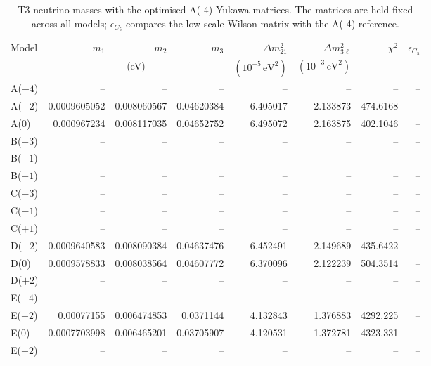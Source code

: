\begin{table}[p]
\centering
\caption{T3 neutrino masses with the optimised A(-4) Yukawa matrices. The matrices are held fixed across all models; $\epsilon_{C_5}$ compares the low-scale Wilson matrix with the A(-4) reference.}
\label{tab:appC_Am4_masses}
\begingroup
\footnotesize
\setlength{\tabcolsep}{3.2pt}
\begin{tabular}{lrrrrrrr}
\hline
Model & $m_1$ & $m_2$ & $m_3$ & $\Delta m^2_{21}$ & $\Delta m^2_{3\ell}$ & $\chi^2$ & $\epsilon_{C_5}$ \\
 & \multicolumn{3}{c}{(eV)} & $(10^{-5}\,\mathrm{eV}^2)$ & $(10^{-3}\,\mathrm{eV}^2)$ &  &  \\
\hline
A($-4$) & -- & -- & -- & -- & -- & -- & -- \\
A($-2$) & 0.0009605052 & 0.008060567 & 0.04620384 & 6.405017 & 2.133873 & 474.6168 & -- \\
A($0$) & 0.000967234 & 0.008117035 & 0.04652752 & 6.495072 & 2.163875 & 402.1046 & -- \\
B($-3$) & -- & -- & -- & -- & -- & -- & -- \\
B($-1$) & -- & -- & -- & -- & -- & -- & -- \\
B($+1$) & -- & -- & -- & -- & -- & -- & -- \\
C($-3$) & -- & -- & -- & -- & -- & -- & -- \\
C($-1$) & -- & -- & -- & -- & -- & -- & -- \\
C($+1$) & -- & -- & -- & -- & -- & -- & -- \\
D($-2$) & 0.0009640583 & 0.008090384 & 0.04637476 & 6.452491 & 2.149689 & 435.6422 & -- \\
D($0$) & 0.0009578833 & 0.008038564 & 0.04607772 & 6.370096 & 2.122239 & 504.3514 & -- \\
D($+2$) & -- & -- & -- & -- & -- & -- & -- \\
E($-4$) & -- & -- & -- & -- & -- & -- & -- \\
E($-2$) & 0.00077155 & 0.006474853 & 0.0371144 & 4.132843 & 1.376883 & 4292.225 & -- \\
E($0$) & 0.0007703998 & 0.006465201 & 0.03705907 & 4.120531 & 1.372781 & 4323.331 & -- \\
E($+2$) & -- & -- & -- & -- & -- & -- & -- \\
\hline
\end{tabular}
\endgroup
\end{table}
